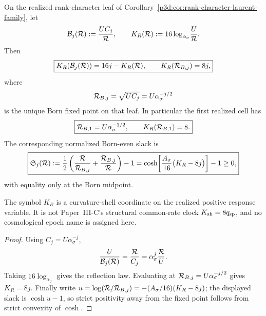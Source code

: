 \documentclass[12pt,a4paper]{article}
\begin{document}
\begin{corollary}
\label{p3d:cor:born-midpoint-shell-coordinate}
On the realized rank-character leaf of
Corollary~\ref{p3d:cor:rank-character-laurent-family}, let
\[
 \mathcal B_j(\mathcal R):=\frac{UC_j}{\mathcal R},
 \qquad
 K_R(\mathcal R):=16\log_{\alpha_\sigma}\!\frac{U}{\mathcal R}.
\]
Then
\begin{equation}
\label{p3d:eq:born-midpoint-shell-reflection}
 \boxed{
 K_R\!\left(\mathcal B_j(\mathcal R)\right)=16j-K_R(\mathcal R),
 \qquad
 K_R(\mathcal R_{B,j})=8j,}
\end{equation}
where
\[
 \mathcal R_{B,j}=\sqrt{UC_j}=U\alpha_\sigma^{-j/2}
\]
is the unique Born fixed point on that leaf.  In particular the first realized
cell has
\[
 \boxed{\mathcal R_{B,1}=U\alpha_\sigma^{-1/2},\qquad K_R(\mathcal R_{B,1})=8.}
\]
The corresponding normalized Born-even slack is
\begin{equation}
\label{p3d:eq:born-midpoint-shell-slack}
 \boxed{
 \mathfrak S_j(\mathcal R)
 :=\frac12\left(\frac{\mathcal R}{\mathcal R_{B,j}}
 +\frac{\mathcal R_{B,j}}{\mathcal R}\right)-1
 =\cosh\!\left[\frac{A_\sigma}{16}\bigl(K_R-8j\bigr)\right]-1\ge0,}
\end{equation}
with equality only at the Born midpoint.

The symbol \(K_R\) is a curvature-shell coordinate on the realized positive
response variable.  It is not Paper~III-C's structural common-rate clock
\(K_{\mathrm{sh}}=8q_{\rm sp}\), and no cosmological epoch name is assigned here.
\end{corollary}

\begin{proof}
Using \(C_j=U\alpha_\sigma^{-j}\),
\[
 \frac{U}{\mathcal B_j(\mathcal R)}
 =\frac{\mathcal R}{C_j}
 =\alpha_\sigma^j\frac{\mathcal R}{U}.
\]
Taking \(16\log_{\alpha_\sigma}\) gives the reflection law.  Evaluating at
\(\mathcal R_{B,j}=U\alpha_\sigma^{-j/2}\) gives \(K_R=8j\).  Finally write
\(u=\log(\mathcal R/\mathcal R_{B,j})=-(A_\sigma/16)(K_R-8j)\); the displayed slack is
\(\cosh u-1\), so strict positivity away from the fixed point follows from
strict convexity of \(\cosh\).
\end{proof}
\end{document}
